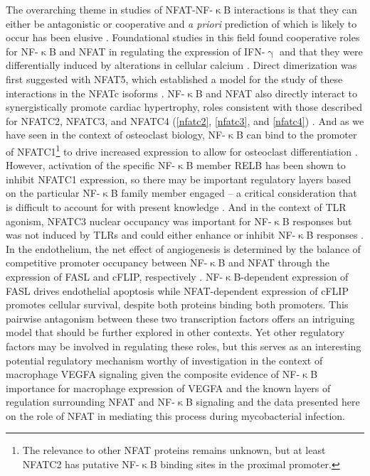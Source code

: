 The overarching theme in studies of NFAT\hyp{}NF\hyp{}$\upkappa$B interactions is that they can either be antagonistic or cooperative and \textit{a priori} prediction of which is likely to occur has been elusive \citep{Khalaf2013, Fisher2006}. Foundational studies in this field found cooperative roles for NF\hyp{}$\upkappa$B and NFAT in regulating the expression of IFN\hyp{}$\upgamma$ \citep{Sica1997} and that they were differentially induced by alterations in cellular calcium \citep{Dolmetsch1997}. Direct dimerization was first suggested with NFAT5, which established a model for the study of these interactions in the NFATc isoforms \citep{LopezRodriguez2001}. NF-$\upkappa$B and NFAT also directly interact to synergistically promote cardiac hypertrophy, roles consistent with those described for NFATC2, NFATC3, and NFATC4 (\autoref{nfatc2}, \autoref{nfatc3}, and \autoref{nfatc4}) \citep{Liu2012}. And as we have seen in the context of osteoclast biology, NF\hyp{}$\upkappa$B can bind to the promoter of NFATC1\footnote{The relevance to other NFAT proteins remains unknown, but at least NFATC2 has putative NF\hyp{}$\upkappa$B binding sites in the proximal promoter.} to drive increased expression to allow for osteoclast differentiation \citep{Asagiri2005}. However, activation of the specific NF\hyp{}$\upkappa$B member RELB has been shown to inhibit NFATC1 expression, so there may be important regulatory layers based on the particular NF\hyp{}$\upkappa$B family member engaged -- a critical consideration that is difficult to account for with present knowledge \citep{Zhao2015}. And in the context of TLR agonism, NFATC3 nuclear occupancy was important for NF\hyp{}$\upkappa$B responses but was not induced by TLRs and could either enhance or inhibit NF\hyp{}$\upkappa$B responses \citep{Minematsu2011, Conboy1999}. In the endothelium, the net effect of angiogenesis is determined by the balance of competitive promoter occupancy between NF\hyp{}$\upkappa$B and NFAT through the expression of FASL and cFLIP, respectively \citep{Aurora2010}. NF\hyp{}$\upkappa$B\hyp{}dependent expression of FASL drives endothelial apoptosis while NFAT\hyp{}dependent expression of cFLIP promotes cellular survival, despite both proteins binding both promoters. This pairwise antagonism between these two transcription factors offers an intriguing model that should be further explored in other contexts. Yet other regulatory factors may be involved in regulating these roles, but this serves as an interesting potential regulatory mechanism worthy of investigation in the context of macrophage VEGFA signaling given the composite evidence of NF\hyp{}$\upkappa$B importance for macrophage expression of VEGFA and the known layers of regulation surrounding NFAT and NF\hyp{}$\upkappa$B signaling and the data presented here on the role of NFAT in mediating this process during mycobacterial infection.

